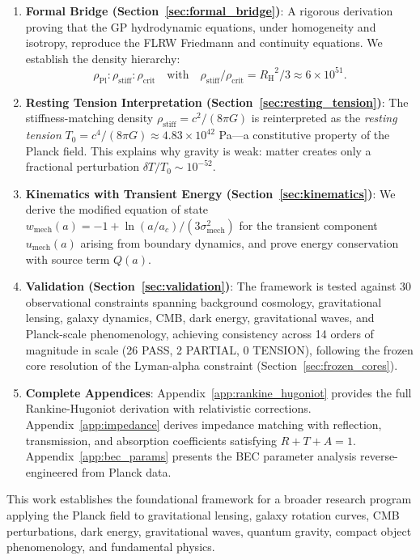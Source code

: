 \documentclass[11pt,a4paper]{article}
\newcommand{\rhocrit}{\ensuremath{\rho_{\mathrm{crit}}}}
\newcommand{\rhostiff}{\ensuremath{\rho_{\mathrm{stiff}}}}
\newcommand{\rhoPl}{\ensuremath{\rho_{\mathrm{Pl}}}}
\newcommand{\Tzero}{\ensuremath{T_0}}
\newcommand{\RH}{\ensuremath{R_{\mathrm{H}}}}
\newcommand{\umech}{\ensuremath{u_{\mathrm{mech}}}}
\newcommand{\wmech}{\ensuremath{w_{\mathrm{mech}}}}
\theoremstyle{definition}
\theoremstyle{remark}
\begin{document}
\begin{enumerate}[leftmargin=*, itemsep=0.3em]
\item \textbf{Formal Bridge (Section~\ref{sec:formal_bridge})}: A rigorous derivation proving that the GP hydrodynamic equations, under homogeneity and isotropy, reproduce the FLRW Friedmann and continuity equations. We establish the density hierarchy:
\begin{equation}
\rhoPl : \rhostiff : \rhocrit \quad \text{with} \quad \rhostiff/\rhocrit = \RH^2/3 \approx 6 \times 10^{51}.
\end{equation}

\item \textbf{Resting Tension Interpretation (Section~\ref{sec:resting_tension})}: The stiffness-matching density $\rhostiff = c^2/(8\pi G)$ is reinterpreted as the \emph{resting tension} $\Tzero = c^4/(8\pi G) \approx 4.83 \times 10^{42}$ Pa---a constitutive property of the Planck field. This explains why gravity is weak: matter creates only a fractional perturbation $\delta T/\Tzero \sim 10^{-52}$.

\item \textbf{Kinematics with Transient Energy (Section~\ref{sec:kinematics})}: We derive the modified equation of state $\wmech(a) = -1 + \ln(a/a_c)/(3\sigma_{\mathrm{mech}}^2)$ for the transient component $\umech(a)$ arising from boundary dynamics, and prove energy conservation with source term $Q(a)$.

\item \textbf{Validation (Section~\ref{sec:validation})}: The framework is tested against 30 observational constraints spanning background cosmology, gravitational lensing, galaxy dynamics, CMB, dark energy, gravitational waves, and Planck-scale phenomenology, achieving consistency across 14 orders of magnitude in scale (26 PASS, 2 PARTIAL, 0 TENSION), following the frozen core resolution of the Lyman-alpha constraint (Section~\ref{sec:frozen_cores}).

\item \textbf{Complete Appendices}: Appendix~\ref{app:rankine_hugoniot} provides the full Rankine-Hugoniot derivation with relativistic corrections. Appendix~\ref{app:impedance} derives impedance matching with reflection, transmission, and absorption coefficients satisfying $R + T + A = 1$. Appendix~\ref{app:bec_params} presents the BEC parameter analysis reverse-engineered from Planck data.
\end{enumerate}

This work establishes the foundational framework for a broader research program applying the Planck field to gravitational lensing, galaxy rotation curves, CMB perturbations, dark energy, gravitational waves, quantum gravity, compact object phenomenology, and fundamental physics.
\end{document}
